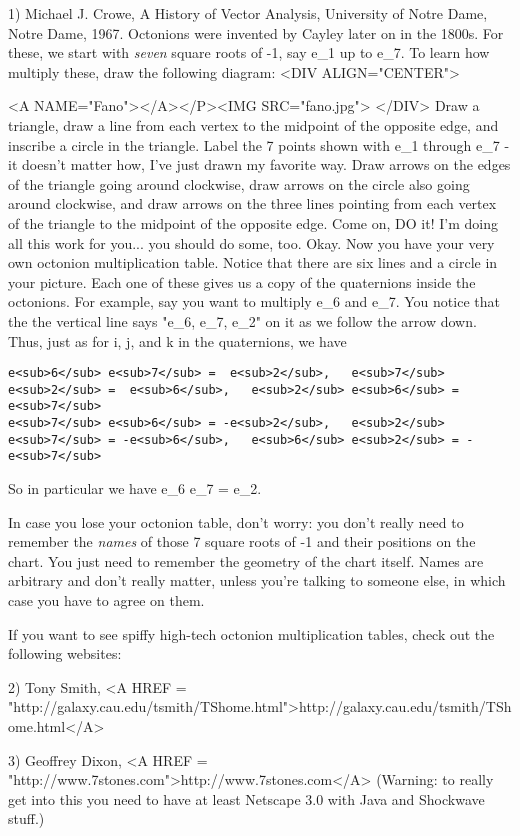 1) Michael J. Crowe, A History of Vector Analysis, University of Notre
Dame, Notre Dame, 1967.
Octonions were invented by Cayley later on in the 1800s.  For these,
we start with \emph{seven} square roots of -1, say e_{1} up to e_{7}.  To learn
how multiply these, draw the following diagram:
<DIV ALIGN="CENTER">

<A NAME="Fano"></A></P><IMG SRC="fano.jpg">
</DIV>
Draw a triangle, draw a line from each vertex to the midpoint of the 
opposite edge, and inscribe a circle in the triangle.  Label the
7 points shown with e_{1} through e_{7} - it doesn't matter how, I've just
drawn my favorite way.  Draw arrows on the edges of the triangle
going around clockwise, draw arrows on the circle also going around
clockwise, and draw arrows on the three lines pointing from each vertex
of the triangle to the midpoint of the opposite edge.  Come on, DO it!
I'm doing all this work for you... you should do some, too.
Okay.  Now you have your very own octonion multiplication table.  Notice
that there are six lines and a circle in your picture.  Each one of
these gives us a copy of the quaternions inside the octonions.   For
example, say you want to multiply e_{6} and e_{7}.  You notice that the
the vertical line says "e_{6}, e_{7}, e_{2}" on it as we follow the arrow down.
Thus, just as for i, j, and k in the quaternions, we have
\begin{verbatim}
e<sub>6</sub> e<sub>7</sub> =  e<sub>2</sub>,   e<sub>7</sub> e<sub>2</sub> =  e<sub>6</sub>,   e<sub>2</sub> e<sub>6</sub> =  e<sub>7</sub>
e<sub>7</sub> e<sub>6</sub> = -e<sub>2</sub>,   e<sub>2</sub> e<sub>7</sub> = -e<sub>6</sub>,   e<sub>6</sub> e<sub>2</sub> = -e<sub>7</sub>
\end{verbatim}
    
So in particular we have e_{6} e_{7} = e_{2}.

In case you lose your octonion table, don't worry: you don't really need
to remember the \emph{names} of those 7 square roots of -1 and their
positions on the chart.  You just need to remember the geometry of the
chart itself.  Names are arbitrary and don't really matter, unless
you're talking to someone else, in which case you have to agree on them.

If you want to see spiffy high-tech octonion multiplication tables,
check out the following websites:

2) Tony Smith, <A HREF = "http://galaxy.cau.edu/tsmith/TShome.html">http://galaxy.cau.edu/tsmith/TShome.html</A>

3) Geoffrey Dixon, <A HREF = "http://www.7stones.com">http://www.7stones.com</A>
(Warning: to really get into
this you need to have at least Netscape 3.0 with Java and Shockwave
stuff.)  


